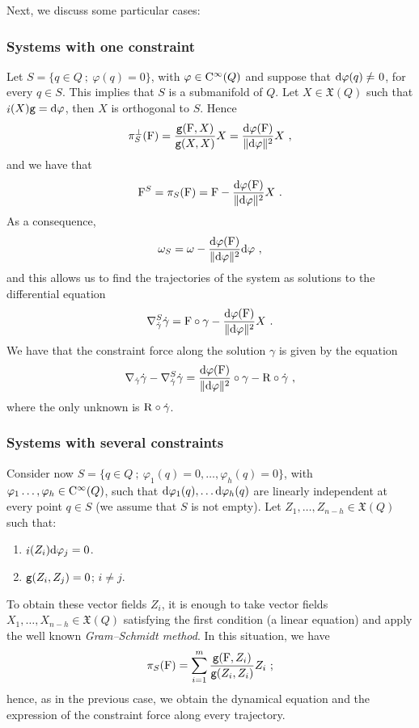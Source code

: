 \documentclass[12pt]{report}
\def\ben{\begin{enumerate}}
\def\een{\end{enumerate}}
\def\moment#1#2#3{{#1}_{#2}, \ldots, {#1}_{#3}}
\def\vf{\mathfrak X}
\def\d{{\rm d}}
\def\inn{\mathop{i}\nolimits}
\def\Cinfty{{\rm C}^\infty}
\renewcommand{\neq}{=\hspace{-3.5mm}/\hspace{2mm}}
\begin{document}
Next, we discuss  some particular cases:

\subsubsection{Systems with one constraint}

Let $S=\{ q\in Q \ ;\ \varphi (q)=0\}$, with $\varphi\in\Cinfty (Q)$ 
and suppose that $\d\varphi(q)\neq 0$, for every $q\in S$. This implies that $S$ is a submanifold of $Q$.
Let $X\in\vf (Q)$ such that $\inn (X){\tt g}=\d\varphi$, then
$X$ is orthogonal to $S$. Hence
$$
\pi^\perp_S({\rm F})=\frac{{\tt g}({\rm F},X)}{{\tt g}(X,X)}X=
\frac{\d\varphi ({\rm F})}{\| \d\varphi\|^2}X \ ,
$$
and we have that
$$
{\rm F}^S=\pi_S({\rm F})={\rm F}-\frac{\d\varphi ({\rm F})}{\| \d\varphi\|^2}X \ .
$$
As a consequence,
$$
\omega_S=\omega-\frac{\d\varphi ({\rm F})}{\| \d\varphi\|^2}\d\varphi \ ,
$$
and this allows us to find the trajectories of the system as solutions to the differential equation
$$
\nabla^S_{\dot\gamma}\dot\gamma=
{\rm F}\circ\gamma-\frac{\d\varphi ({\rm F})}{\| \d\varphi\|^2}X \ .
$$
We have that the constraint force along the solution $\gamma$ is given by the equation
$$
\nabla_{\dot\gamma}\dot\gamma-\nabla^S_{\dot\gamma}\dot\gamma=
\frac{\d\varphi ({\rm F})}{\| \d\varphi\|^2}\circ\gamma-{\rm R}\circ\dot\gamma \ ,
$$
where the only unknown is ${\rm R}\circ\dot\gamma$.

\subsubsection{Systems with several constraints}

Consider now
$S=\{ q\in Q \ ;\ \varphi_1(q)=0,\ldots ,\varphi_h(q)=0\}$,
with $\varphi_1\ldots ,\varphi_h\in\Cinfty (Q)$, such that
$\d\varphi_1(q),\ldots\d\varphi_h(q)$ are linearly independent at every point $q\in S$ (we assume that $S$ is not empty).
Let $\moment{Z}{1}{n-h}\in\vf (Q)$ such that:
\ben
\item
$\inn (Z_i)\d\varphi_j=0$.
\item
${\tt g}(Z_i,Z_j)=0$; $i\not= j$.
\een
To obtain these vector fields $Z_i$, it is enough to take vector fields
$\moment{X}{1}{n-h}\in\vf (Q)$ satisfying the first condition (a linear equation) and apply the well known {\sl Gram--Schmidt method}.
In this situation,  we have
$$
\pi_S({\rm F})=\sum_{i=1}^m\frac{{\tt g}({\rm F},Z_i)}{{\tt g}(Z_i,Z_i)}Z_i \ ;
$$
hence, as in the previous case, we obtain the dynamical equation and the expression of the constraint force along every trajectory.
\end{document}
